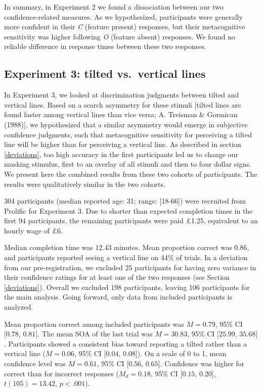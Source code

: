 \documentclass[12pt,twoside]{reedthesis}
\begin{document}
In summary, in Experiment 2 we found a dissociation between our two confidence-related measures. As we hypothesized, participants were generally more confident in their \emph{C} (feature present) responses, but their metacognitive sensitivity was higher following \emph{O} (feature absent) responses. We found no reliable difference in response times between these two responses.

\hypertarget{experiment-3-tilted-vs.-vertical-lines}{%
\subsection{Experiment 3: tilted vs.~vertical lines}\label{experiment-3-tilted-vs.-vertical-lines}}

In Experiment 3, we looked at discrimination judgments between tilted and vertical lines. Based on a search asymmetry for these stimuli {[}tilted lines are found faster among vertical lines than vice versa; A. Treisman \& Gormican (1988){]}, we hypothesized that a similar asymmetry would emerge in subjective confidence judgments, such that metacognitive sensitivity for perceiving a tilted line will be higher than for perceiving a vertical line. As described in section \ref{deviations}, too high accuracy in the first participants led us to change our masking stimulus, first to an overlay of all stimuli and then to four dollar signs. We present here the combined results from these two cohorts of participants. The results were qualitatively similar in the two cohorts.

304 participants (median reported age: 31; range: {[}18-66{]}) were recruited from Prolific for Experiment 3. Due to shorter than expected completion times in the first 94 participants, the remaining participants were paid £1.25, equivalent to an hourly wage of £6.

Median completion time was 12.43 minutes. Mean proportion correct was 0.86, and participants reported seeing a vertical line on 44\% of trials. In a deviation from our pre-registration, we excluded 25 participants for having zero variance in their confidence ratings for at least one of the two responses (see Section \ref{deviations}). Overall we excluded 198 participants, leaving 106 participants for the main analysis. Going forward, only data from included participants is analyzed.

Mean proportion correct among included participants was \(M = 0.79\), 95\% CI \([0.78\), \(0.81]\). The mean SOA of the last trial was \(M = 30.83\), 95\% CI \([25.99\), \(35.68]\). Participants showed a consistent bias toward reporting a tilted rather than a vertical line (\(M = 0.06\), 95\% CI \([0.04\), \(0.08]\)). On a scale of 0 to 1, mean confidence level was \(M = 0.61\), 95\% CI \([0.56\), \(0.65]\). Confidence was higher for correct than for incorrect responses (\(M_d = 0.18\), 95\% CI \([0.15\), \(0.20]\), \(t(105) = 13.42\), \(p < .001\)).
\end{document}
